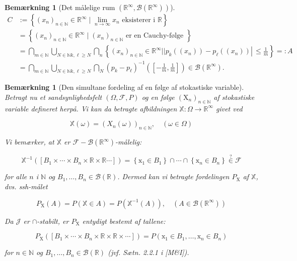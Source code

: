 \documentclass{article}
\newcommand{\R}{\mathbb{R}}
\newcommand{\1}{\mathbbm{1}}
\newtheorem{remark}[theorem]{Bemærkning}
\theoremstyle{boxed}
\begin{document}
\begin{remark}[Det målelige rum $(\R^{\infty},\mathcal{B}(\R^{\infty}))$]
$$
\begin{aligned}
C & :=\left\{\left(x_n\right)_{n \in \mathbb{N}} \in \mathbb{R}^{\infty} \mid \lim _{n \rightarrow \infty} x_n \text { eksisterer i } \mathbb{R}\right\} \\
& =\left\{\left(x_n\right)_{n \in \mathbb{N}} \in \mathbb{R}^{\infty} \mid\left(x_n\right)_{n \in \mathbb{N}} \text { er en Cauchy-følge }\right\} \\
& =\bigcap_{m \in \mathbb{N}} \bigcup_{N \in \mathbb{N} k, \ell \geq N} \bigcap_n\left\{\left(x_n\right)_{n \in \mathbb{N}} \in \mathbb{R}^{\infty}| | p_k\left(\left(x_n\right)\right)-p_{\ell}\left(\left(x_n\right)\right) \left\lvert\, \leq \frac{1}{m}\right.\right\}=: A \\
& =\bigcap_{m \in \mathbb{N}} \bigcup_{N \in \mathbb{N} k, \ell \geq N} \bigcap_N\left(p_k-p_{\ell}\right)^{-1}\left(\left[-\frac{1}{m}, \frac{1}{m}\right]\right) \in \mathcal{B}\left(\mathbb{R}^{\infty}\right) .
\end{aligned}
$$
\end{remark}
\begin{remark}[Den simultane fordeling af en følge af stokastiske variable]
    Betragt nu et sandsynlighedsfelt $(\Omega, \mathcal{F}, P)$ og en følge $\left(\mathrm{X}_n\right)_{n \in \mathbb{N}}$ af stokastiske variable defineret herpå.
    Vi kan da betragte afbildningen $\mathbb{X}: \Omega \rightarrow \mathbb{R}^{\infty}$ givet ved
    
    $$
    \mathbb{X}(\omega)=\left(X_n(\omega)\right)_{n \in \mathbb{N}}, \quad(\omega \in \Omega)
    $$
    
    
    Vi bemærker, at $\mathbb{X}$ er $\mathcal{F}-\mathcal{B}\left(\mathbb{R}^{\infty}\right)$-målelig:
    
    $$
    \mathbb{X}^{-1}\left(\left[B_1 \times \cdots \times B_n \times \mathbb{R} \times \mathbb{R} \cdots\right]\right)=\left\{\mathrm{x}_1 \in B_1\right\} \cap \cdots \cap\left\{\mathrm{x}_n \in B_n\right\} \stackrel{?}{\in} \mathcal{F}
    $$
    
    for alle $n$ i $\mathbb{N}$ og $B_1, \ldots, B_n \in \mathcal{B}(\mathbb{R})$.
    Dermed kan vi betragte fordelingen $P_{\mathrm{X}}$ af $\mathbb{X}$, dvs. ssh-målet
    
    $$
    P_{\mathrm{X}}(A)=P(\mathbb{X} \in A)=P\left(\mathbb{X}^{-1}(A)\right), \quad\left(A \in \mathcal{B}\left(\mathbb{R}^{\infty}\right)\right)
    $$
    
    
    Da $\mathcal{J}$ er $\cap$-stabilt, er $P_{\mathrm{X}}$ entydigt bestemt af tallene:
    
    $$
    P_{\mathrm{X}}\left(\left[B_1 \times \cdots \times B_n \times \mathbb{R} \times \mathbb{R} \times \cdots\right]\right)=P\left(\mathrm{x}_1 \in B_1, \ldots, \mathrm{x}_n \in B_n\right)
    $$
    
    for $n \in \mathbb{N}$ og $B_1, \ldots, B_n \in \mathcal{B}(\mathbb{R})$ (jvf. Sætn. 2.2.1 i [M\&I]).
\end{remark}
\end{document}
